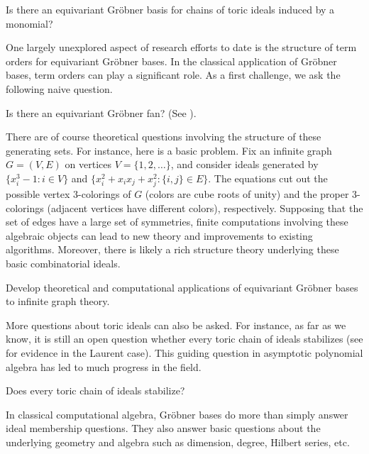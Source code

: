 \begin{question}
Is there an equivariant Gr\"obner basis for chains of toric ideals induced by a monomial?
\end{question}

One largely unexplored aspect of research efforts to date is the structure of term orders for equivariant Gr\"obner bases.  In the classical application of Gr\"obner bases, term orders can play a significant role.  As a first challenge, we ask the following naive question.

\begin{question}
Is there an equivariant Gr\"obner fan?  (See \cite{sturmfels1996grobner}).
\end{question}

There are of course theoretical questions involving the structure of these generating sets.  For instance, here is a basic problem.  Fix an infinite graph $G = (V,E)$ on vertices $V = \{1,2,\ldots\}$, and consider ideals generated by $\{x_i^3-1: i \in V\}$ and $\{x_i^2 + x_i x_j +x_j^2: \{i,j\} \in E\}$.  The equations cut out the possible vertex $3$-colorings of $G$ (colors are cube roots of unity) and the proper $3$-colorings (adjacent vertices have different colors), respectively.  Supposing that the set of edges have a large set of symmetries, finite computations involving these algebraic objects can lead to new theory and improvements to existing algorithms.  Moreover, there is likely a rich structure theory underlying these basic combinatorial ideals.

\begin{problem}
Develop theoretical and computational applications of equivariant Gr\"obner bases to infinite graph theory.
\end{problem}

More questions about toric ideals can also be asked.  For instance, as far as we know, it is still an open question whether every toric chain of ideals stabilizes (see \cite{Hillar13} for evidence in the Laurent case).  This guiding question in asymptotic polynomial algebra has led to much progress in the field.

\begin{question}
Does every toric chain of ideals stabilize?
\end{question}

In classical computational algebra, Gr\"obner bases do more than simply answer ideal membership questions.  They also answer basic questions about the underlying geometry and algebra such as dimension, degree, Hilbert series, etc.  

